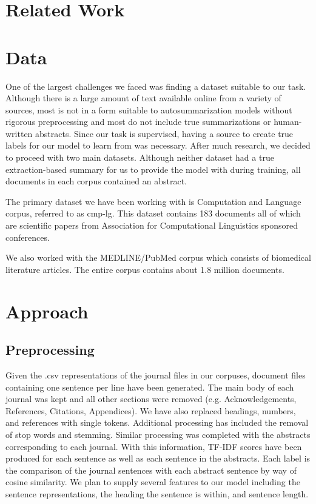 \documentclass[11pt]{article}
\begin{document}
\section{Related Work}
	 

\section{Data} %
	One of the largest challenges we faced was finding a dataset suitable to our task. Although there is a large amount of text available online from a variety of sources, most is not in a form suitable to autosummarization models without rigorous preprocessing and most do not include true summarizations or human-written abstracts. Since our task is supervised, having a source to create true labels for our model to learn from was necessary. After much research, we decided to proceed with two main datasets. Although neither dataset had a true extraction-based summary for us to provide the model with during training, all documents in each corpus contained an abstract. 
	
	The primary dataset we have been working with is Computation and Language corpus, referred to as cmp-lg. This dataset contains 183 documents all of which are scientific papers from Association for Computational Linguistics sponsored conferences. 
	
	We also worked with the MEDLINE/PubMed corpus which consists of biomedical literature articles. The entire corpus contains about 1.8 million documents.

\section{Approach}
	\subsection{Preprocessing} %
		Given the .csv representations of the journal files in our corpuses, document files containing one sentence per line have been generated. The main body of each journal was kept and all other sections were removed (e.g. Acknowledgements, References, Citations, Appendices). We have also replaced headings, numbers, and references with single tokens. Additional processing has included the removal of stop words and stemming. Similar processing was completed with the abstracts corresponding to each journal. With this information, TF-IDF scores have been produced for each sentence as well as each sentence in the abstracts. Each label is the comparison of the journal sentences with each abstract sentence by way of cosine similarity. We plan to supply several features to our model including the sentence representations, the heading the sentence is within, and sentence length.
	
\end{document}
